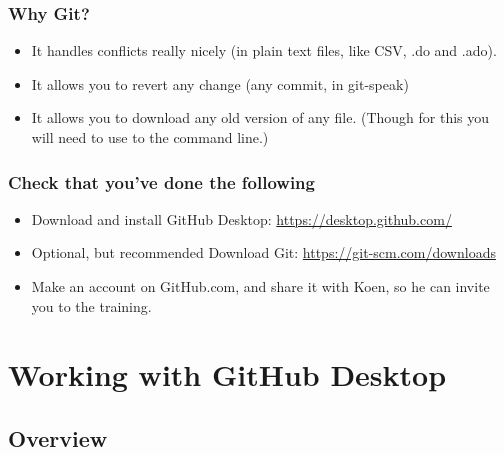 \documentclass{beamer}
\begin{document}

\begin{frame}
	\frametitle{Why Git?}
	\begin{itemize}
		\item It handles conflicts really nicely (in plain text files, like CSV, .do and .ado).
		\item It allows you to revert any change (any commit, in git-speak)
		\item It allows you to download any old version of any file. (Though for this you will need to use to the command line.)
	\end{itemize}
\end{frame}


\begin{frame}
\frametitle{Check that you've done the following}
	\begin{itemize}
		\item Download and install GitHub Desktop: \url{https://desktop.github.com/}
		\item Optional, but recommended Download Git: \url{https://git-scm.com/downloads} 
		\item Make an account on GitHub.com, and share it with Koen, so he can invite you to the training.
	\end{itemize}
\end{frame}

\section{Working with GitHub Desktop}

\subsection{Overview}
\end{document}
